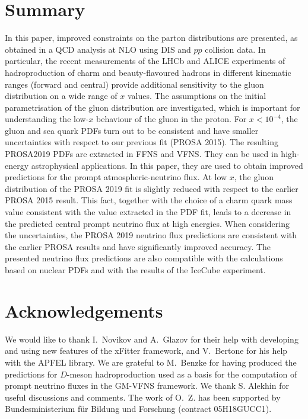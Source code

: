 \documentclass[12pt]{article}
\begin{document}
%
%


\section{Summary}
\label{sec:summary}

In this paper, improved constraints on the parton distributions are presented, as obtained in a QCD analysis at NLO using DIS and $pp$ collision data. In particular, the recent measurements of the LHCb and ALICE experiments of hadroproduction of charm and beauty-flavoured hadrons in different kinematic ranges (forward and central) provide additional sensitivity to the gluon distribution on a wide range of $x$ values. The assumptions on the initial parametrisation of the gluon distribution are investigated, which is important for understanding the low-$x$ behaviour of the gluon in the proton. For $x < 10^{-4}$, the gluon and sea quark PDFs turn out to be consistent and have smaller uncertainties with respect to our previous fit (PROSA 2015). The resulting PROSA2019 PDFs are extracted in FFNS and VFNS. They can be used in high-energy astrophysical applications. In this paper, they  
 are used to obtain improved predictions for the prompt atmospheric-neutrino flux.
At low $x$, the gluon distribution of the PROSA 2019 fit is slightly reduced with respect to the earlier PROSA 2015 result. This fact, together with the choice of a charm quark mass value consistent with the value extracted in the PDF fit, leads to a decrease in the predicted central prompt neutrino flux at high energies. When considering the uncertainties, the PROSA 2019 neutrino flux predictions are consistent with the earlier PROSA results and have significantly improved accuracy. The presented neutrino flux predictions are also compatible with the calculations based on nuclear PDFs and with the results of the IceCube experiment. 


\section*{Acknowledgements}

We would like to thank I.~Novikov and A.~Glazov for their help with developing and using new features of the xFitter framework, and V.~Bertone for his help with the APFEL library. We are grateful to M.~Benzke for having produced the predictions for $D$-meson hadroproduction used as a basis for the computation of prompt neutrino fluxes in the GM-VFNS framework. We thank S. Alekhin for useful discussions and comments. The work of O.~Z. has been supported by Bundesministerium f\"ur Bildung und Forschung (contract 05H18GUCC1). 
\end{document}
